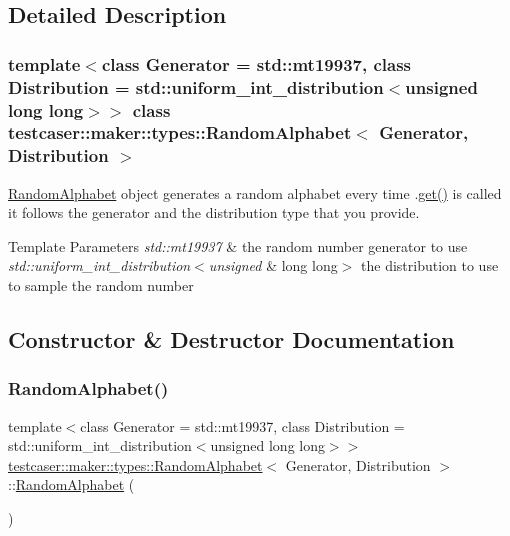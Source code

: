 \subsection{Detailed Description}
\subsubsection*{template$<$class Generator = std\+::mt19937, class Distribution = std\+::uniform\+\_\+int\+\_\+distribution$<$unsigned long long$>$$>$\newline
class testcaser\+::maker\+::types\+::\+Random\+Alphabet$<$ Generator, Distribution $>$}

\mbox{\hyperlink{classtestcaser_1_1maker_1_1types_1_1RandomAlphabet}{Random\+Alphabet}} object generates a random alphabet every time .\mbox{\hyperlink{classtestcaser_1_1maker_1_1types_1_1RandomAlphabet_a6498f1e44b84cb66c1c1dc6de642b218}{get()}} is called it follows the generator and the distribution type that you provide. 


\begin{DoxyTemplParams}{Template Parameters}
{\em std\+::mt19937} & the random number generator to use \\
\hline
{\em std\+::uniform\+\_\+int\+\_\+distribution$<$unsigned} & long long$>$ the distribution to use to sample the random number \\
\hline
\end{DoxyTemplParams}


\subsection{Constructor \& Destructor Documentation}
\mbox{\label{classtestcaser_1_1maker_1_1types_1_1RandomAlphabet_ab4cab36c953e73837f726215309577ba}} 
\subsubsection{\texorpdfstring{RandomAlphabet()}{RandomAlphabet()}}
{\footnotesize\ttfamily template$<$class Generator = std\+::mt19937, class Distribution = std\+::uniform\+\_\+int\+\_\+distribution$<$unsigned long long$>$$>$ \\
\mbox{\hyperlink{classtestcaser_1_1maker_1_1types_1_1RandomAlphabet}{testcaser\+::maker\+::types\+::\+Random\+Alphabet}}$<$ Generator, Distribution $>$\+::\mbox{\hyperlink{classtestcaser_1_1maker_1_1types_1_1RandomAlphabet}{Random\+Alphabet}} (\begin{DoxyParamCaption}{ }\end{DoxyParamCaption})\hspace{0.3cm}{\ttfamily [inline]}}



